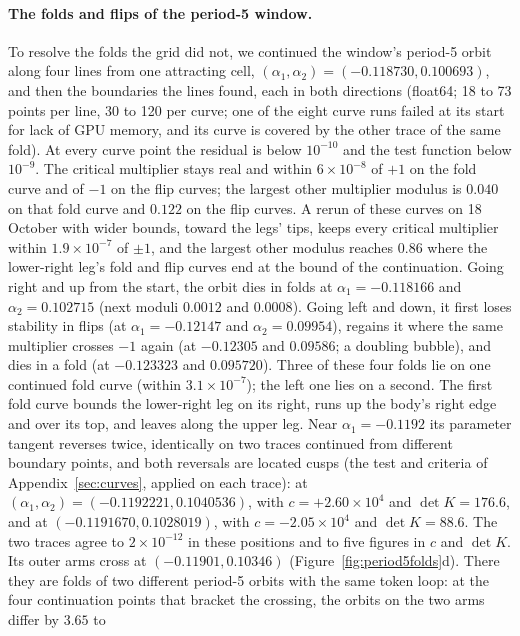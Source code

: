 \documentclass[11pt,letterpaper]{article}
\begin{document}
\paragraph{The folds and flips of the period-5 window.} To resolve the folds the grid did not, we continued the
window's period-5 orbit along four lines from one attracting cell, $(\alpha_1,\alpha_2)=(-0.118730,0.100693)$, and
then the boundaries the lines found, each in both directions (float64; 18 to 73 points per line, 30 to 120 per curve;
one of the eight curve runs failed at its start for lack of GPU memory, and its curve is covered by the other trace of
the same fold). At every curve point the residual is below $10^{-10}$ and the test function below $10^{-9}$. The
critical multiplier stays real and within $6\times10^{-8}$ of $+1$ on the fold curve and of $-1$ on the flip curves;
the largest other multiplier modulus is $0.040$ on that fold curve and $0.122$ on the flip curves. A rerun of these
curves on 18 October with wider bounds, toward the legs' tips, keeps every critical multiplier within
$1.9\times10^{-7}$ of $\pm1$, and the largest other modulus reaches $0.86$ where the lower-right leg's fold and flip
curves end at the bound of the continuation. Going right and up from the start, the orbit dies
in folds at $\alpha_1=-0.118166$ and $\alpha_2=0.102715$ (next moduli $0.0012$ and $0.0008$). Going left and down, it
first loses stability in flips (at $\alpha_1=-0.12147$ and $\alpha_2=0.09954$), regains it where the same multiplier
crosses $-1$ again (at $-0.12305$ and $0.09586$; a doubling bubble), and dies in a fold (at $-0.123323$ and
$0.095720$). Three of these four folds lie on one continued fold curve (within $3.1\times10^{-7}$); the left one lies on a
second. The first fold curve bounds the lower-right leg on its right, runs up the body's right edge and over its top, and
leaves along the upper leg. Near $\alpha_1=-0.1192$ its parameter tangent reverses twice, identically on two traces
continued from different boundary points, and both reversals are located cusps (the test and criteria of
Appendix~\ref{sec:curves}, applied on each trace): at $(\alpha_1,\alpha_2)=(-0.1192221,0.1040536)$, with
$c=+2.60\times10^{4}$ and $\det K=176.6$, and at $(-0.1191670,0.1028019)$, with $c=-2.05\times10^{4}$ and
$\det K=88.6$. The two traces agree to $2\times10^{-12}$ in these positions and to five figures in $c$ and $\det K$.
Its outer arms cross at $(-0.11901,0.10346)$ (Figure~\ref{fig:period5folds}d). There they are folds of two different period-5 orbits with
the same token loop: at the four continuation points that bracket the crossing, the orbits on the two arms differ by $3.65$ to
\end{document}
